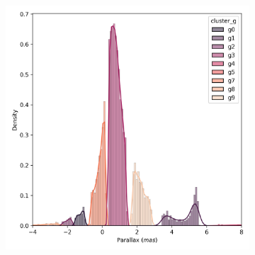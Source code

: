 \documentclass[preprint,12pt,authoryear]{elsarticle}
\begin{document}
\begin{figure}[!hbt]
\begin{subfigure}{0.29\textwidth}
  \end{subfigure}
  \begin{subfigure}{0.29\textwidth}
    \includegraphics[width=\textwidth]{../figures/ngc_2632/dec_parallax_filtered_ngc_2632.png}
  \end{subfigure}


\end{figure}
\end{document}
